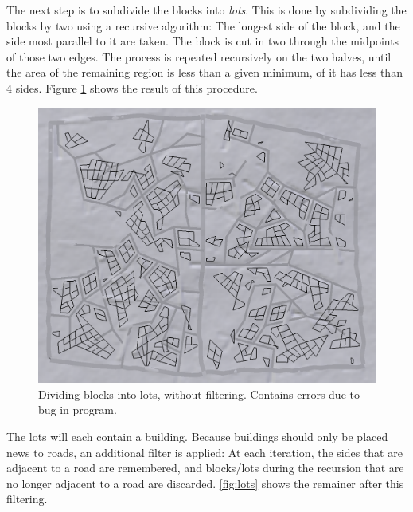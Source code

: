 \documentclass[a4paper,12pt]{scrartcl}
\begin{document}
The next step is to subdivide the blocks into \emph{lots}. This is done by subdividing the blocks by two using a recursive algorithm: The longest side of the block, and the side most parallel to it are taken. The block is cut in two through the midpoints of those two edges. The process is repeated recursively on the two halves, until the area of the remaining region is less than a given minimum, of it has less than 4 sides. Figure \ref{fig:alllots} shows the result of this procedure.

\begin{figure}[h]
\center
\includegraphics[width=\textwidth]{alllots.png}
\caption{Dividing blocks into lots, without filtering. Contains errors due to bug in program.}
\label{fig:alllots}
\end{figure}

The lots will each contain a building. Because buildings should only be placed news to roads, an additional filter is applied: At each iteration, the sides that are adjacent to a road are remembered, and blocks/lots during the recursion that are no longer adjacent to a road are discarded. \ref{fig:lots} shows the remainer after this filtering.
\end{document}
